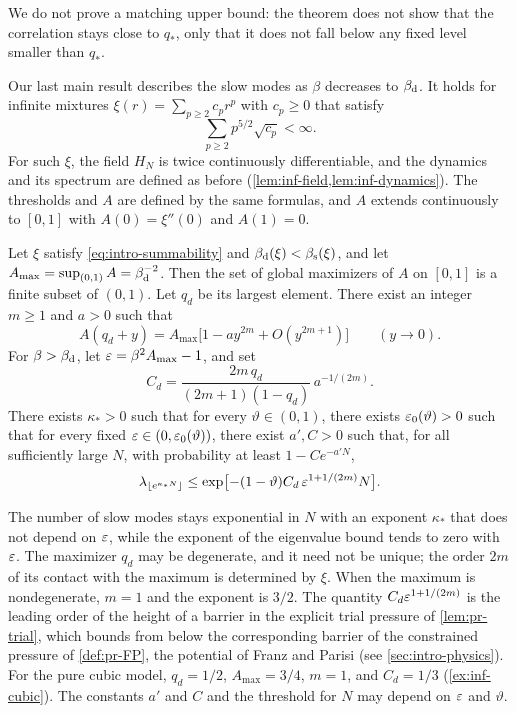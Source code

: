 We do not prove a matching upper bound: the theorem does not show that the correlation stays close to $q_*$, only that it does not fall below any fixed level smaller than $q_*$.

Our last main result describes the slow modes as $\beta$ decreases to $\beta_{\mathrm d}$. It holds for infinite mixtures $\xi(r)=\sum_{p\ge2}c_pr^p$ with $c_p\ge0$ that satisfy
\begin{equation}\label{eq:intro-summability}
\sum_{p\ge2}p^{5/2}\sqrt{c_p}<\infty.
\end{equation}
For such $\xi$, the field $H_N$ is twice continuously differentiable, and the dynamics and its spectrum are defined as before (\cref{lem:inf-field,lem:inf-dynamics}). The thresholds and $A$ are defined by the same formulas, and $A$ extends continuously to $[0,1]$ with $A(0)=\xi''(0)$ and $A(1)=0$.

\begin{theorem}\label{thm:main-cusp}
Let $\xi$ satisfy \eqref{eq:intro-summability} and $\beta_{\mathrm d}(\xi)<\beta_{\mathrm s}(\xi)$, and let $A_{\max}=\sup_{(0,1)}A=\beta_{\mathrm d}^{-2}$. Then the set of global maximizers of $A$ on $[0,1]$ is a finite subset of $(0,1)$. Let $q_d$ be its largest element. There exist an integer $m\ge1$ and $a>0$ such that
\begin{equation*}
A(q_d+y)=A_{\max}\bigl[1-ay^{2m}+O(y^{2m+1})\bigr]\qquad(y\to0).
\end{equation*}
For $\beta>\beta_{\mathrm d}$, let $\varepsilon=\beta^2A_{\max}-1$, and set
\begin{equation*}
C_d=\frac{2m\,q_d}{(2m+1)(1-q_d)}\,a^{-1/(2m)}.
\end{equation*}
There exists $\kappa_*>0$ such that for every $\vartheta\in(0,1)$, there exists $\varepsilon_0(\vartheta)>0$ such that for every fixed $\varepsilon\in(0,\varepsilon_0(\vartheta))$, there exist $a',C>0$ such that, for all sufficiently large $N$, with probability at least $1-Ce^{-a'N}$,
\begin{equation*}
\lambda_{\lfloor e^{\kappa_*N}\rfloor}\le\exp\bigl[-(1-\vartheta)C_d\,\varepsilon^{1+1/(2m)}N\bigr].
\end{equation*}
\end{theorem}

The number of slow modes stays exponential in $N$ with an exponent $\kappa_*$ that does not depend on $\varepsilon$, while the exponent of the eigenvalue bound tends to zero with $\varepsilon$. The maximizer $q_d$ may be degenerate, and it need not be unique; the order $2m$ of its contact with the maximum is determined by $\xi$. When the maximum is nondegenerate, $m=1$ and the exponent is $3/2$. The quantity $C_d\varepsilon^{1+1/(2m)}$ is the leading order of the height of a barrier in the explicit trial pressure of \cref{lem:pr-trial}, which bounds from below the corresponding barrier of the constrained pressure of \cref{def:pr-FP}, the potential of Franz and Parisi (see \cref{sec:intro-physics}). For the pure cubic model, $q_d=1/2$, $A_{\max}=3/4$, $m=1$, and $C_d=1/3$ (\cref{ex:inf-cubic}). The constants $a'$ and $C$ and the threshold for $N$ may depend on $\varepsilon$ and $\vartheta$.

